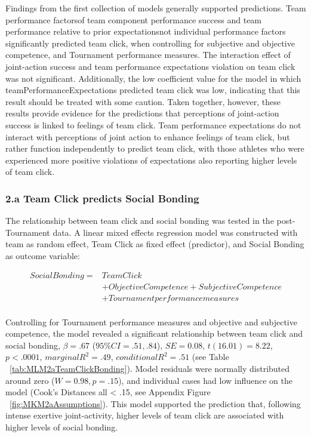 Findings from the first collection of models generally supported predictions. Team performance factors\nobreakdashperceptions of team component performance success and team performance relative to prior expectations\nobreakdashbut not individual performance factors significantly predicted team click, when controlling for subjective and objective competence, and Tournament performance measures.  The interaction effect of joint-action success and team performance expectations violation on team click was not significant.  Additionally, the low coefficient value for the model in which teamPerformanceExpectations predicted team click was low, indicating that this result should be treated with some caution.  Taken together, however, these results provide evidence for the predictions that perceptions of joint-action success is linked to feelings of team click.  Team performance expectations do not interact with perceptions of joint action to enhance feelings of team click, but rather function independently to predict team click, with those athletes who were experienced more positive violations of expectations also reporting higher levels of team click.






\subsubsection{2.a Team Click predicts Social Bonding}
The relationship between team click and social bonding was tested in the post-Tournament data. A linear mixed effects regression model was constructed with team as random effect, Team Click as fixed effect (predictor), and Social Bonding as outcome variable:

\begin{equation}
  \begin{align*}
    Social Bonding   =& Team Click\\
                    &+ Objective Competence + Subjective Competence  \\
                    &+ Tournament performance measures \\
  \end{align*}
\end{equation}
\bigskip

Controlling for Tournament performance measures and objective and subjective competence, the model revealed a significant relationship between team click and social bonding, $\beta = .67$ ($95\% CI =  .51, .84$), $SE = 0.08$, $t(16.01) = 8.22$, $p < .0001$, $marginal R^2 = .49$, $conditional R^2 = .51$ (see Table ~\ref{tab:MLM2aTeamClickBonding}).  Model residuals were normally distributed around zero ($W = 0.98, p = .15$), and individual cases had low influence on the model (Cook's Distances all < .15, see Appendix Figure ~\ref{fig:MKM2aAssumptions}).  This model supported the prediction that, following intense exertive joint-activity, higher levels of team click are associated with higher levels of social bonding.


